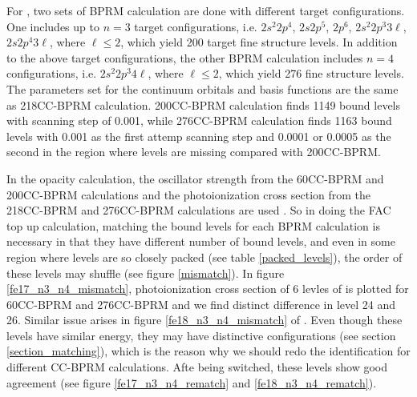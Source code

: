 For , two sets of BPRM calculation are done with different target configurations. One includes up to $n=3$ target configurations, i.e. $2s^2 2p^4$, $2s 2p^5$, $2p^6$, $2s^2 2p^3 3\ell$, $2s 2p^4 3\ell$, where $\ell\leq2$, which yield 200 target fine structure levels. In addition to the above target configurations,  the other BPRM calculation includes $n=4$ configurations, i.e. $2s^2 2p^3 4\ell$, where $\ell\leq2$, which yield 276 fine structure levels. The parameters set for the continuum orbitals and basis functions are the same as   218CC-BPRM calculation. 200CC-BPRM calculation finds 1149 bound levels with scanning step of 0.001, while 276CC-BPRM calculation finds 1163 bound levels with 0.001 as the first attemp scanning step and 0.0001 or 0.0005 as the second in the region where levels are missing compared with 200CC-BPRM.

In the opacity calculation, the oscillator strength from the 60CC-BPRM and 200CC-BPRM calculations and the photoionization cross section from the 218CC-BPRM and  276CC-BPRM calculations are used \citep{rmop_5}. So in doing the FAC top up calculation, matching the bound levels for each BPRM calculation is necessary in that they have different number of bound levels, and even in some region where levels are so closely packed (see table \ref{packed_levels}), the order of these levels may shuffle (see figure \ref{mismatch}). In figure \ref{fe17_n3_n4_mismatch}, photoionization cross section of 6 levles of  is plotted for 60CC-BPRM and 276CC-BPRM and we find distinct difference in level 24 and 26. Similar issue arises in figure \ref{fe18_n3_n4_mismatch} of . Even though these levels have similar energy, they may have distinctive configurations (see section \ref{section_matching}), which is the reason why we should redo the identification for different CC-BPRM calculations. Afte being switched, these levels show good agreement (see figure \ref{fe17_n3_n4_rematch} and \ref{fe18_n3_n4_rematch}).

